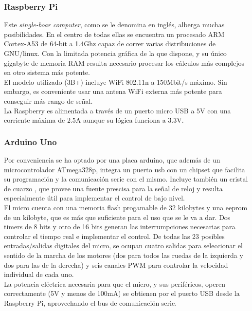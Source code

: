 \subsubsection{Raspberry Pi}
Este \textit{single-boar computer}, como se le denomina en inglés, alberga muchas posibilidades. En el centro de todas ellas se encuentra un procesado ARM Cortex-A53 de 64-bit a 1.4Ghz capaz de correr varias distribuciones de GNU/linux. Con la limitada potencia gráfica de la que dispone, y su único gigabyte de memoria RAM resulta necesario procesar los cálculos más complejos en otro sistema más potente.\\
El modelo utilizado (3B+) incluye WiFi 802.11n a 150Mbit/s máximo. Sin embargo, es conveniente usar una antena WiFi externa más potente para conseguir más rango de señal.\\
La Raspberry es alimentada a través de un puerto micro USB a 5V con una corriente máxima de 2.5A aunque su lógica funciona a 3.3V.
\subsubsection{Arduino Uno}
Por conveniencia se ha optado por una placa arduino, que además de un microcontrolador ATmega328p, integra un puerto usb con un chipset que facilita su programación y la comunicación serie con el mismo. Incluye también un cristal de cuarzo , que provee una fuente prescisa para la señal de reloj y resulta especialmente útil para implementar el control de bajo nivel.\\
El micro cuenta con una memoria flash progamable de 32 kilobytes y una eeprom de un kilobyte, que es más que suficiente para el uso que se le va a dar. Dos timers de 8 bits y otro de 16 bits generan las interrumpciones necesarias para controlar el tiempo real e implementar el control. De todas las 23 posibles entradas/salidas digitales del micro, se ocupan cuatro salidas para seleccionar el sentido de la marcha de los motores (dos para todos las ruedas de la izquierda y dos para las de la derecha) y seis canales PWM para controlar la velocidad individual de cada uno.\\
La potencia eléctrica necesaria para que el micro, y sus periféricos, operen correctamente (5V y menos de 100mA) se obtienen por el puerto USB desde la Raspberry Pi, aprovechando el bus de comunicación serie.

